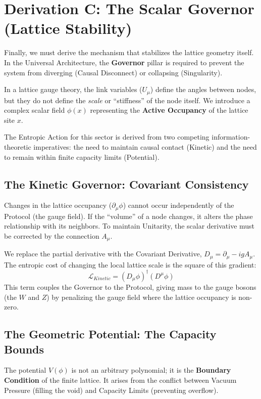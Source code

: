 \section{Derivation C: The Scalar Governor (Lattice Stability)}
\label{sec:higgs}


Finally, we must derive the mechanism that stabilizes the lattice geometry itself. In the Universal Architecture, the \textbf{Governor} pillar is required to prevent the system from diverging (Causal Disconnect) or collapsing (Singularity).

In a lattice gauge theory, the link variables ($U_\mu$) define the angles between nodes, but they do not define the \textit{scale} or ``stiffness'' of the node itself. We introduce a complex scalar field $\phi(x)$ representing the \textbf{Active Occupancy} of the lattice site $x$.

The Entropic Action for this sector is derived from two competing information-theoretic imperatives: the need to maintain causal contact (Kinetic) and the need to remain within finite capacity limits (Potential).

\subsection{The Kinetic Governor: Covariant Consistency}
Changes in the lattice occupancy ($\partial_\mu \phi$) cannot occur independently of the Protocol (the gauge field). If the ``volume'' of a node changes, it alters the phase relationship with its neighbors. To maintain Unitarity, the scalar derivative must be corrected by the connection $A_\mu$.

We replace the partial derivative with the Covariant Derivative, $D_\mu = \partial_\mu - igA_\mu$. The entropic cost of changing the local lattice scale is the square of this gradient:
\begin{equation}
    \mathcal{L}_{Kinetic} = (D_\mu \phi)^\dagger (D^\mu \phi)
\end{equation}
This term couples the Governor to the Protocol, giving mass to the gauge bosons (the $W$ and $Z$) by penalizing the gauge field where the lattice occupancy is non-zero.

\subsection{The Geometric Potential: The Capacity Bounds}
The potential $V(\phi)$ is not an arbitrary polynomial; it is the \textbf{Boundary Condition} of the finite lattice. It arises from the conflict between Vacuum Pressure (filling the void) and Capacity Limits (preventing overflow).

